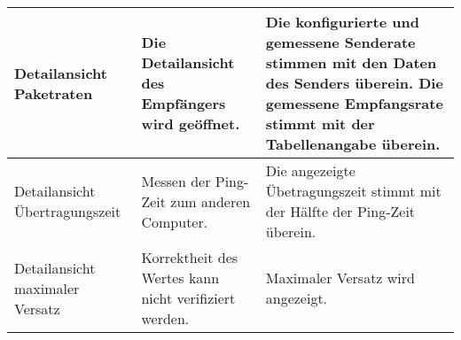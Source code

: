 \begin{table}[h]
\begin{center}
\begin{tabular}{|p{2.5cm}|p{5cm}|p{7.55cm}|}
                \hline
                    Detailansicht Paketraten & Die Detailansicht des Empfängers
                    wird geöffnet.& Die konfigurierte und gemessene Senderate
                    stimmen mit den Daten des Senders überein. Die gemessene
                    Empfangsrate stimmt mit der Tabellenangabe überein.\\
                \hline
                    Detailansicht Übertragungszeit & Messen der Ping-Zeit zum
                    anderen Computer. & Die angezeigte Übetragungszeit stimmt
                    mit der Hälfte der Ping-Zeit überein.\\
                \hline
                    Detailansicht maximaler Versatz & Korrektheit des Wertes
                    kann nicht verifiziert werden. & Maximaler Versatz wird
                    angezeigt.\\
                \hline
            \end{tabular}
        \end{center}
    \end{table}